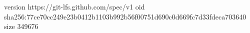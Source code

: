 version https://git-lfs.github.com/spec/v1
oid sha256:77ce70cc249e23b0412b1103b992b56f00751d690c0d669fc7d33fdeca703640
size 349676
